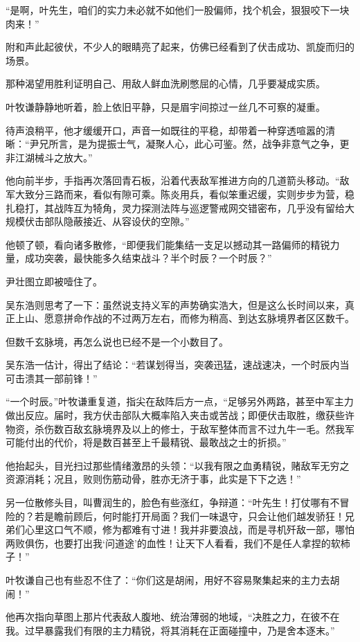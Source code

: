 “是啊，叶先生，咱们的实力未必就不如他们一股偏师，找个机会，狠狠咬下一块肉来！”

附和声此起彼伏，不少人的眼睛亮了起来，仿佛已经看到了伏击成功、凯旋而归的场景。

那种渴望用胜利证明自己、用敌人鲜血洗刷憋屈的心情，几乎要凝成实质。

叶牧谦静静地听着，脸上依旧平静，只是眉宇间掠过一丝几不可察的凝重。

待声浪稍平，他才缓缓开口，声音一如既往的平稳，却带着一种穿透喧嚣的清晰：“尹兄所言，是为提振士气，凝聚人心，此心可鉴。然，战争非意气之争，更非江湖械斗之放大。”

他向前半步，手指再次落回青石板，沿着代表敌军推进方向的几道箭头移动。“敌军大致分三路而来，看似有隙可乘。陈炎用兵，看似笨重迟缓，实则步步为营，稳扎稳打，其战阵互为犄角，灵力探测法阵与巡逻警戒网交错密布，几乎没有留给大规模伏击部队隐蔽接近、从容设伏的空隙。”

他顿了顿，看向诸多散修，“即便我们能集结一支足以撼动其一路偏师的精锐力量，成功突袭，最快能多久结束战斗？半个时辰？一个时辰？”

尹壮图立即被噎住了。

吴东浩则思考了一下：虽然说支持义军的声势确实浩大，但是这么长时间以来，真正上山、愿意拼命作战的不过两万左右，而修为稍高、到达玄脉境界者区区数千。

但数千玄脉境，再怎么说也已经不是一个小数目了。

吴东浩一估计，得出了结论：“若谋划得当，突袭迅猛，速战速决，一个时辰内当可击溃其一部前锋！”

“一个时辰。”叶牧谦重复道，指尖在敌阵后方一点，“足够另外两路，甚至中军主力做出反应。届时，我方伏击部队大概率陷入夹击或苦战；即便伏击取胜，缴获些许物资，杀伤数百敌玄脉境界及以上的修士，于敌军整体而言不过九牛一毛。然我军可能付出的代价，将是数百甚至上千最精锐、最敢战之士的折损。”

他抬起头，目光扫过那些情绪激昂的头领：“以我有限之血勇精锐，赌敌军无穷之资源消耗；况且，败则伤筋动骨，胜亦无济于事，此实是下下之选！”

另一位散修头目，叫曹润生的，脸色有些涨红，争辩道：“叶先生！打仗哪有不冒险的？若是瞻前顾后，何时能打开局面？我们一味退守，只会让他们越发骄狂！兄弟们心里这口气不顺，修为都难有寸进！我并非要浪战，而是寻机歼敌一部，哪怕两败俱伤，也要打出我‘问道途’的血性！让天下人看看，我们不是任人拿捏的软柿子！”

叶牧谦自己也有些忍不住了：“你们这是胡闹，用好不容易聚集起来的主力去胡闹！”

他再次指向草图上那片代表敌人腹地、统治薄弱的地域，“决胜之力，在彼不在我。过早暴露我们有限的主力精锐，将其消耗在正面碰撞中，乃是舍本逐末。”

